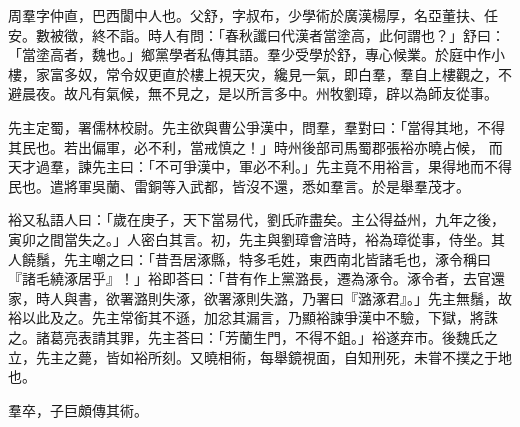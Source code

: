 \begin{pinyinscope}
 
 
 周羣字仲直，巴西閬中人也。父舒，字叔布，少學術於廣漢楊厚，名亞董扶、任安。數被徵，終不詣。時人有問：「春秋讖曰代漢者當塗高，此何謂也？」舒曰：「當塗高者，魏也。」鄉黨學者私傳其語。羣少受學於舒，專心候業。於庭中作小樓，家富多奴，常令奴更直於樓上視天灾，纔見一氣，即白羣，羣自上樓觀之，不避晨夜。故凡有氣候，無不見之，是以所言多中。州牧劉璋，辟以為師友從事。
 
 
 
 
先主定蜀，署儒林校尉。先主欲與曹公爭漢中，問羣，羣對曰：「當得其地，不得其民也。若出偏軍，必不利，當戒慎之！」時州後部司馬蜀郡張裕亦曉占候，
 而天才過羣，諫先主曰：「不可爭漢中，軍必不利。」先主竟不用裕言，果得地而不得民也。遣將軍吳蘭、雷銅等入武都，皆沒不還，悉如羣言。於是舉羣茂才。
 
 
 
 
 裕又私語人曰：「歲在庚子，天下當易代，劉氏祚盡矣。主公得益州，九年之後，寅卯之間當失之。」人密白其言。初，先主與劉璋會涪時，裕為璋從事，侍坐。其人饒鬚，先主嘲之曰：「昔吾居涿縣，特多毛姓，東西南北皆諸毛也，涿令稱曰『諸毛繞涿居乎』！」裕即荅曰：「昔有作上黨潞長，遷為涿令。涿令者，去官還家，時人與書，欲署潞則失涿，欲署涿則失潞，乃署曰『潞涿君』。」先主無鬚，故裕以此及之。先主常銜其不遜，加忿其漏言，乃顯裕諫爭漢中不驗，下獄，將誅之。諸葛亮表請其罪，先主荅曰：「芳蘭生門，不得不鉏。」裕遂弃市。後魏氏之立，先主之薨，皆如裕所刻。又曉相術，每舉鏡視面，自知刑死，未甞不撲之于地也。
 
 
 
 
 羣卒，子巨頗傳其術。
 
 
\end{pinyinscope}